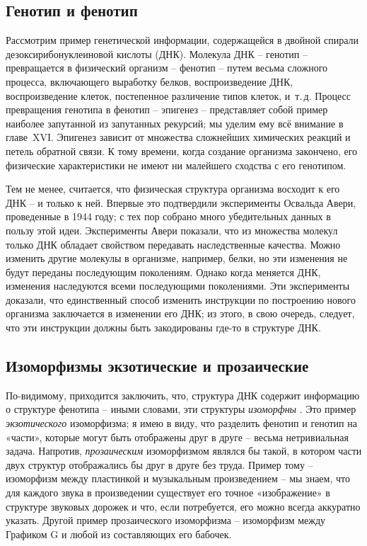 \documentclass[../main.tex]{subfiles}
\begin{document}
\subsection{Генотип и фенотип}

Рассмотрим пример генетической информации, содержащейся в двойной спирали дезоксирибонуклеиновой кислоты (ДНК). Молекула ДНК \--- генотип \--- превращается в физический организм \--- фенотип \--- путем весьма сложного процесса, включающего выработку белков, воспроизведение ДНК, воспроизведение клеток, постепенное различение типов клеток, и~т.\,д. Процесс превращения генотипа в фенотип \--- эпигенез \--- представляет собой пример наиболее запутанной из запутанных рекурсий; мы уделим ему всё внимание в главе~XVI\@. Эпигенез зависит от множества сложнейших химических реакций и петель обратной связи. К тому времени, когда создание организма закончено, его физические характеристики не имеют ни малейшего сходства с его генотипом.

Тем не менее, считается, что физическая структура организма восходит к его ДНК \--- и только к ней. Впервые это подтвердили эксперименты Освальда Авери, проведенные в 1944 году; с тех пор собрано много убедительных данных в пользу этой идеи. Эксперименты Авери показали, что из множества молекул только ДНК обладает свойством передавать наследственные качества. Можно изменить другие молекулы в организме, например, белки, но эти изменения не будут переданы последующим поколениям. Однако когда меняется ДНК, изменения наследуются всеми последующими поколениями. Эти эксперименты доказали, что единственный способ изменить инструкции по построению нового организма заключается в изменении его ДНК; из этого, в свою очередь, следует, что эти инструкции должны быть закодированы где-то в структуре ДНК\@.


\subsection{Изоморфизмы экзотические и прозаические}

По-видимому, приходится заключить, что, структура ДНК содержит информацию о структуре фенотипа \--- иными словами, эти структуры \emph{изоморфны} . Это пример \emph{экзотического} изоморфизма; я имею в виду, что разделить фенотип и генотип на «части», которые могут быть отображены друг в друге \--- весьма нетривиальная задача. Напротив, \emph{прозаическим} изоморфизмом являлся бы такой, в котором части двух структур отображались бы друг в друге без труда. Пример тому \--- изоморфизм между пластинкой и музыкальным произведением \--- мы знаем, что для каждого звука в произведении существует его точное «изображение» в структуре звуковых дорожек и что, если потребуется, его можно всегда аккуратно указать. Другой пример прозаического изоморфизма \--- изоморфизм между Графиком G и любой из составляющих его бабочек.
\end{document}
